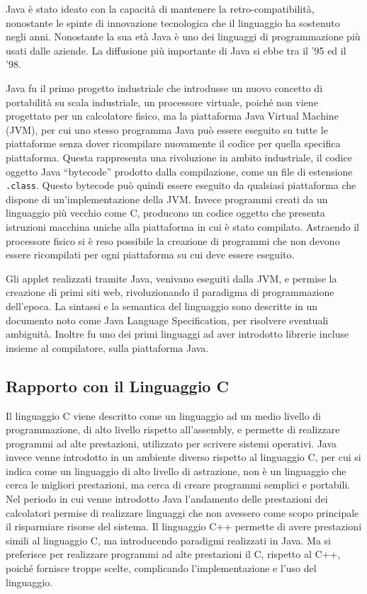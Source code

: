 \documentclass{article}
\numberwithin{equation}{subsection}
\begin{document}
Java è stato ideato con la capacità di mantenere la retro-compatibilità, nonostante le spinte di innovazione tecnologica che il linguaggio ha sostenuto 
negli anni. Nonostante la sua età Java è uno dei linguaggi di programmazione più usati dalle aziende. 
La diffusione più importante di Java si ebbe tra il '95 ed il '98. %


Java fu il primo progetto industriale che introdusse un nuovo concetto di portabilità su scala industriale, un processore virtuale, poiché non viene progettato per un 
calcolatore fisico, ma la piattaforma Java Virtual Machine (JVM), per cui uno stesso programma Java può essere eseguito su tutte le piattaforme senza dover ricompilare 
nuovamente il codice per quella specifica piattaforma. Questa rappresenta una rivoluzione in ambito industriale, il codice oggetto Java ``bytecode'' prodotto dalla 
compilazione, come un file di estensione \verb|.class|. Questo bytecode può quindi essere eseguito da qualsiasi piattaforma che dispone di un'implementazione della 
JVM. Invece programmi creati da un linguaggio più vecchio come C, producono un codice oggetto che presenta istruzioni macchina uniche alla piattaforma in cui è stato 
compilato. Astraendo il processore fisico si è reso possibile la creazione di programmi che non devono essere ricompilati per ogni piattaforma su cui deve essere eseguito. 

Gli applet realizzati tramite Java, venivano eseguiti dalla JVM, e permise la creazione di primi siti web, rivoluzionando il paradigma di programmazione dell'epoca. 
La sintassi e la semantica del linguaggio sono descritte in un documento noto come Java Language Specification, per risolvere eventuali ambiguità. Inoltre fu uno dei primi 
linguaggi ad aver introdotto librerie incluse insieme al compilatore, sulla piattaforma Java. 

\subsection{Rapporto con il Linguaggio C}

Il linguaggio C viene descritto come un linguaggio ad un medio livello di programmazione, di alto livello rispetto all'assembly, e permette di realizzare programmi ad alte 
prestazioni, utilizzato per scrivere sistemi operativi. Java invece venne introdotto in un ambiente diverso rispetto al linguaggio C, per cui si indica come un linguaggio 
di alto livello di astrazione, non è un linguaggio che cerca le migliori prestazioni, ma cerca di creare programmi semplici e portabili. Nel periodo in cui venne introdotto 
Java l'andamento delle prestazioni dei calcolatori permise di realizzare linguaggi che non avessero come scopo principale il risparmiare risorse del sistema. Il linguaggio 
C++ permette di avere prestazioni simili al linguaggio C, ma introducendo paradigmi realizzati in Java. Ma si preferisce per realizzare programmi ad alte prestazioni il 
C, rispetto al C++, poiché fornisce troppe scelte, complicando l'implementazione e l'uso del linguaggio. 
\end{document}
